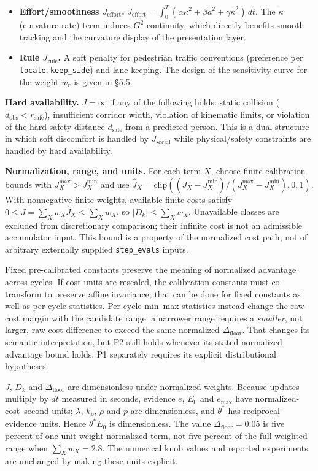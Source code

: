\documentclass[11pt]{article}
\newcommand{\Dfloor}{\Delta_{\text{floor}}}
\newcommand{\code}[1]{\texttt{#1}}
\begin{document}
\begin{itemize}
\item \textbf{Effort/smoothness $J_{\text{effort}}$.} $J_{\text{effort}} = \int_0^T (\alpha \kappa^2 + \beta a^2 + \gamma \dot\kappa^2)\, dt$. The $\dot\kappa$ (curvature rate) term induces $G^2$ continuity, which directly benefits smooth tracking and the curvature display of the presentation layer.
\item \textbf{Rule $J_{\text{rule}}$.} A soft penalty for pedestrian traffic conventions (preference per \code{locale.keep\_side}) and lane keeping. The design of the sensitivity curve for the weight $w_r$ is given in \S5.5.
\end{itemize}

\textbf{Hard availability.} $J = \infty$ if any of the following holds: static collision ($d_{\text{obs}} < r_{\text{safe}}$), insufficient corridor width, violation of kinematic limits, or violation of the hard safety distance $d_{\text{safe}}$ from a predicted person. This is a dual structure in which soft discomfort is handled by $J_{\text{social}}$ while physical/safety constraints are handled by hard availability.

\textbf{Normalization, range, and units.} For each term $X$, choose finite calibration bounds with $J_X^{\max}>J_X^{\min}$ and use $\hat J_X=\mathrm{clip}((J_X-J_X^{\min})/(J_X^{\max}-J_X^{\min}),0,1)$. With nonnegative finite weights, available finite costs satisfy $0\le J=\sum_Xw_X\hat J_X\le\sum_Xw_X$, so $|D_k|\le\sum_Xw_X$. Unavailable classes are excluded from discretionary comparison; their infinite cost is not an admissible accumulator input. This bound is a property of the normalized cost path, not of arbitrary externally supplied \code{step\_evals} inputs.

Fixed pre-calibrated constants preserve the meaning of normalized advantage across cycles. If cost units are rescaled, the calibration constants must co-transform to preserve affine invariance; that can be done for fixed constants as well as per-cycle statistics. Per-cycle min--max statistics instead change the raw-cost margin with the candidate range: a narrower range requires a \emph{smaller}, not larger, raw-cost difference to exceed the same normalized $\Dfloor$. That changes its semantic interpretation, but P2 still holds whenever its stated normalized advantage bound holds. P1 separately requires its explicit distributional hypotheses.

$J$, $D_k$ and $\Dfloor$ are dimensionless under normalized weights. Because updates multiply by $dt$ measured in seconds, evidence $e$, $E_0$ and $e_{\max}$ have normalized-cost--second units; $\lambda$, $k_\rho$, $\rho$ and $p$ are dimensionless, and $\theta^*$ has reciprocal-evidence units. Hence $\theta^*E_0$ is dimensionless. The value $\Dfloor=0.05$ is five percent of one unit-weight normalized term, not five percent of the full weighted range when $\sum_Xw_X=2.8$. The numerical knob values and reported experiments are unchanged by making these units explicit.
\end{document}
